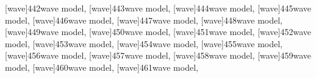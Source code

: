 \documentclass[a4paper,11pt]{article}
\begin{document}
[wave]{442}{wave model},
[wave]{443}{wave model},
[wave]{444}{wave model},
[wave]{445}{wave model},
[wave]{446}{wave model},
[wave]{447}{wave model},
[wave]{448}{wave model}, \\
[wave]{449}{wave model},
[wave]{450}{wave model},
[wave]{451}{wave model},
[wave]{452}{wave model},
[wave]{453}{wave model},
[wave]{454}{wave model},
[wave]{455}{wave model}, \\
[wave]{456}{wave model},
[wave]{457}{wave model},
[wave]{458}{wave model},
[wave]{459}{wave model},
[wave]{460}{wave model},
[wave]{461}{wave model},


























































































































\end{document}
